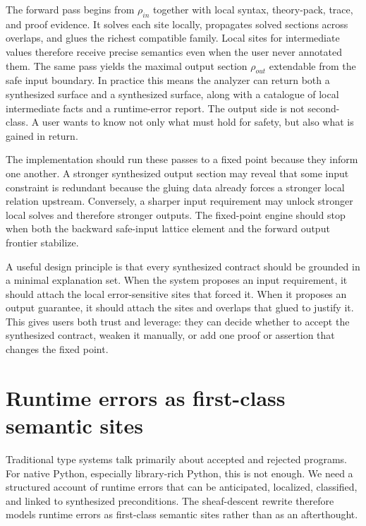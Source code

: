 \documentclass[11pt]{report}
\DeclareRobustCommand{\py}[1]{\texttt{\detokenize{#1}}}
\theoremstyle{definition}
\theoremstyle{plain}
\begin{document}
The forward pass begins from $\rho_{in}$ together with local syntax, theory-pack,
trace, and proof evidence. It solves each site locally, propagates solved
sections across overlaps, and glues the richest compatible family. Local sites
for intermediate values therefore receive precise semantics even when the user
never annotated them. The same pass yields the maximal output section
$\rho_{out}$ extendable from the safe input boundary. In practice this means the
analyzer can return both a synthesized \py{requires} surface and a synthesized
\py{ensures} surface, along with a catalogue of local intermediate facts and a
runtime-error report. The output side is not second-class. A user wants to know
not only what must hold for safety, but also what is gained in return.

The implementation should run these passes to a fixed point because they inform
one another. A stronger synthesized output section may reveal that some input
constraint is redundant because the gluing data already forces a stronger local
relation upstream. Conversely, a sharper input requirement may unlock stronger
local solves and therefore stronger outputs. The fixed-point engine should stop
when both the backward safe-input lattice element and the forward output frontier
stabilize.

A useful design principle is that every synthesized contract should be grounded
in a minimal explanation set. When the system proposes an input requirement, it
should attach the local error-sensitive sites that forced it. When it proposes an
output guarantee, it should attach the sites and overlaps that glued to justify
it. This gives users both trust and leverage: they can decide whether to accept
the synthesized contract, weaken it manually, or add one proof or assertion that
changes the fixed point.


\section{Runtime errors as first-class semantic sites}

Traditional type systems talk primarily about accepted and rejected programs.
For native Python, especially library-rich Python, this is not enough. We need a
structured account of runtime errors that can be anticipated, localized,
classified, and linked to synthesized preconditions. The sheaf-descent rewrite
therefore models runtime errors as first-class semantic sites rather than as an
afterthought.
\end{document}
